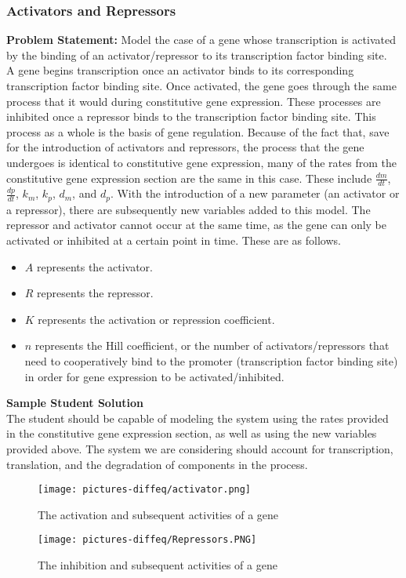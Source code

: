 \subsubsection{Activators and Repressors}

\textbf{Problem Statement: } Model the case of a gene whose transcription is activated by the binding of an activator/repressor to its transcription factor binding site.\\

A gene begins transcription once an activator binds to its corresponding transcription factor binding site. Once activated, the gene goes through the same process that it would during constitutive gene expression. These processes are inhibited once a repressor binds to the transcription factor binding site. This process as a whole is the basis of gene regulation.
Because of the fact that, save for the introduction of activators and repressors, the process that the gene undergoes is identical to constitutive gene expression, many of the rates from the constitutive gene expression section are the same in this case. These include $\frac{dm}{dt}$, $\frac{dp}{dt}$, $k_{m}$, $k_{p}$, $d_{m}$, and $d_{p}$. With the introduction of a new parameter (an activator or a repressor), there are subsequently new variables added to this model. The repressor and activator cannot occur at the same time, as the gene can only be activated or inhibited at a certain point in time. These are as follows.

\begin{itemize}
    \item $A$ represents the activator.
    \item $R$ represents the repressor.
    \item $K$ represents the activation or repression coefficient.
    \item $n$ represents the Hill coefficient, or the number of activators/repressors that need to cooperatively bind to the promoter (transcription factor binding site) in order for gene expression to be activated/inhibited.
\end{itemize}

\noindent \textbf{Sample Student Solution} \\

The student should be capable of modeling the system using the rates provided in the constitutive gene expression section, as well as using the new variables provided above. The system we are considering should account for transcription, translation, and the degradation of components in the process.
\begin{figure}[H]
    \centering
    \texttt{[image: pictures-diffeq/activator.png]}
    \caption{The activation and subsequent activities of a gene}
\end{figure}
\begin{figure}[H]
    \centering
    \texttt{[image: pictures-diffeq/Repressors.PNG]}
    \caption{The inhibition and subsequent activities of a gene}
\end{figure}

